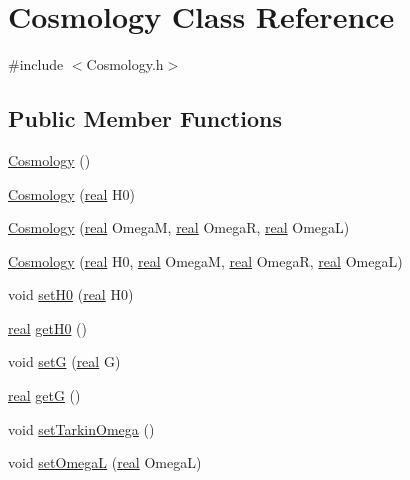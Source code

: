 \section{Cosmology Class Reference}
\label{classCosmology}


{\ttfamily \#include $<$Cosmology.h$>$}

\subsection*{Public Member Functions}
\begin{DoxyCompactItemize}
\item 
\hyperlink{classCosmology_a65605ac821284585c4b7cec76506c0cd}{Cosmology} ()
\item 
\hyperlink{classCosmology_a8203287b6ef58664a6975d659b496d7c}{Cosmology} (\hyperlink{Global_8h_a031f8951175b43076c2084a6c2173410}{real} H0)
\item 
\hyperlink{classCosmology_aeba46061f992fb98aa923cc8b32df880}{Cosmology} (\hyperlink{Global_8h_a031f8951175b43076c2084a6c2173410}{real} OmegaM, \hyperlink{Global_8h_a031f8951175b43076c2084a6c2173410}{real} OmegaR, \hyperlink{Global_8h_a031f8951175b43076c2084a6c2173410}{real} OmegaL)
\item 
\hyperlink{classCosmology_a851b79b6de150af41af3b91485c1c338}{Cosmology} (\hyperlink{Global_8h_a031f8951175b43076c2084a6c2173410}{real} H0, \hyperlink{Global_8h_a031f8951175b43076c2084a6c2173410}{real} OmegaM, \hyperlink{Global_8h_a031f8951175b43076c2084a6c2173410}{real} OmegaR, \hyperlink{Global_8h_a031f8951175b43076c2084a6c2173410}{real} OmegaL)
\item 
void \hyperlink{classCosmology_a40349514dde1ba14eb7ec052989cdd04}{setH0} (\hyperlink{Global_8h_a031f8951175b43076c2084a6c2173410}{real} H0)
\item 
\hyperlink{Global_8h_a031f8951175b43076c2084a6c2173410}{real} \hyperlink{classCosmology_adb3b68e5a216361a6ad1b2f73e8d7afd}{getH0} ()
\item 
void \hyperlink{classCosmology_a492150261f6b3717cf2c22bd3058908a}{setG} (\hyperlink{Global_8h_a031f8951175b43076c2084a6c2173410}{real} G)
\item 
\hyperlink{Global_8h_a031f8951175b43076c2084a6c2173410}{real} \hyperlink{classCosmology_a0b9e83975c4d1109c58f1b1584678db2}{getG} ()
\item 
void \hyperlink{classCosmology_a208a7205e5b4ca66f65d5e9a5a193b81}{setTarkinOmega} ()
\item 
void \hyperlink{classCosmology_a6efc081201eee3de624ce776d24ddd42}{setOmegaL} (\hyperlink{Global_8h_a031f8951175b43076c2084a6c2173410}{real} OmegaL)

\end{DoxyCompactItemize}
